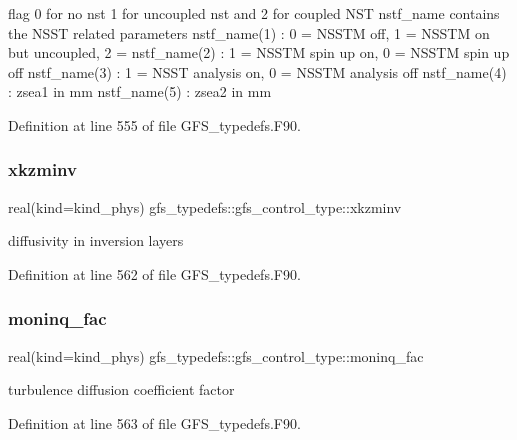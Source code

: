 flag 0 for no nst 1 for uncoupled nst and 2 for coupled N\+ST nstf\+\_\+name contains the N\+S\+ST related parameters nstf\+\_\+name(1) \+: 0 = N\+S\+S\+TM off, 1 = N\+S\+S\+TM on but uncoupled, 2 = nstf\+\_\+name(2) \+: 1 = N\+S\+S\+TM spin up on, 0 = N\+S\+S\+TM spin up off nstf\+\_\+name(3) \+: 1 = N\+S\+ST analysis on, 0 = N\+S\+S\+TM analysis off nstf\+\_\+name(4) \+: zsea1 in mm nstf\+\_\+name(5) \+: zsea2 in mm 



Definition at line 555 of file G\+F\+S\+\_\+typedefs.\+F90.

\mbox{\label{structgfs__typedefs_1_1gfs__control__type_af5cf69308f78b4ecddecd4532d686b2d}} 
\subsubsection{xkzminv}
{\footnotesize\ttfamily real(kind=kind\+\_\+phys) gfs\+\_\+typedefs\+::gfs\+\_\+control\+\_\+type\+::xkzminv}



diffusivity in inversion layers 



Definition at line 562 of file G\+F\+S\+\_\+typedefs.\+F90.

\mbox{\label{structgfs__typedefs_1_1gfs__control__type_a275a1b739351ae2f694fd4d386581b2c}} 
\subsubsection{moninq\+\_\+fac}
{\footnotesize\ttfamily real(kind=kind\+\_\+phys) gfs\+\_\+typedefs\+::gfs\+\_\+control\+\_\+type\+::moninq\+\_\+fac}



turbulence diffusion coefficient factor 



Definition at line 563 of file G\+F\+S\+\_\+typedefs.\+F90.

\mbox{\label{structgfs__typedefs_1_1gfs__control__type_a69d9ba8b1dffac6caa221a4c8a9decbd}} 

